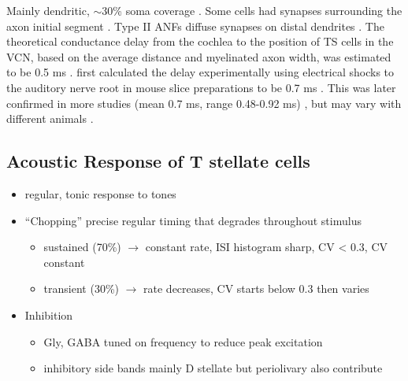 Mainly dendritic, $\sim$30\% soma coverage \citep[Cat][]{Cant:1981,Cant:1982,RyugoWrightEtAl:1993,TolbertMorest:1982a}. 
\citep[cat][Soma: 36$\pm$10.5 \%  of 21 (range 6-38) \% area coverage, Prox: 43$\pm$29 \%  of 46 \% area cov., Distal: 40$\pm$12 \%  of 22 \% area cov.]{SmithRhode:1989}
Some cells had synapses surrounding the axon initial segment \citep{JosephsonMorest:1998}. 
Type II ANFs diffuse synapses on distal dendrites \citep{BensonBrown:2004}.
The theoretical conductance delay from the cochlea to the position of TS cells in the VCN, based on the average distance and myelinated axon width, was estimated to be 0.5 ms  \citep{Brown:1993,BrownLedwith:1990}. 
\citet{Oertel:1983} first calculated the delay experimentally using electrical shocks to the auditory nerve root in mouse slice preparations to be 0.7 ms \citep{Oertel:1983}. 
This was later confirmed in more studies (mean 0.7 ms, range 0.48-0.92 ms) \citep[Mice][]{FerragamoGoldingEtAl:1998a}, but may vary with different animals  \citep[0.5 ms in chinchilla][]{WickesbergOertel:1993}. 




\subsection{Acoustic Response of T stellate cells}

\begin{itemize}
\item regular, tonic response to tones \citep{RhodeOertelEtAl:1983,SmithRhode:1989,BlackburnSachs:1989}
\item ``Chopping'' precise regular timing that degrades throughout stimulus\citep{YoungRobertEtAl:1988,BlackburnSachs:1989}
\begin{itemize}
\item sustained (70\%) $\rightarrow$ constant rate, ISI histogram sharp, CV < 0.3, CV constant
\item transient (30\%) $\rightarrow$ rate decreases, CV starts below 0.3 then varies
\end{itemize}
\item Inhibition
\begin{itemize}
\item Gly, GABA tuned on frequency to reduce peak excitation \citep{CasparyBackoffEtAl:1994}
\item inhibitory side bands mainly D stellate \citep{FerragamoGoldingEtAl:1998a} but periolivary also contribute \citep{AdamsWarr:1976,Adams:1983,ShoreHelfertEtAl:1991,OstapoffBensonEtAl:1997}
\end{itemize}
\end{itemize}
\citep{PalombiCaspary:1992,RhodeSmith:1986,NelkenYoung:1994,PaoliniClareyEtAl:2005,PaoliniClareyEtAl:2004}  

